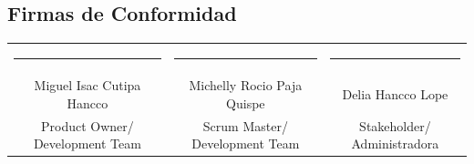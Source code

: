 \documentclass[12pt,a4paper]{article}
\renewcommand{\arraystretch}{1.25}
\begin{document}
\subsection*{Firmas de Conformidad}

\begin{center}
\renewcommand{\arraystretch}{2}
\begin{tabular}{ccc}
\rule{4.5cm}{0.4pt} & \rule{4.5cm}{0.4pt} & \rule{4.5cm}{0.4pt} \\
Miguel Isac Cutipa Hancco & Michelly Rocio Paja Quispe & Delia Hancco Lope \\
Product Owner/ Development Team & Scrum Master/ Development Team & Stakeholder/ Administradora
\end{tabular}
\end{center}
\end{document}
